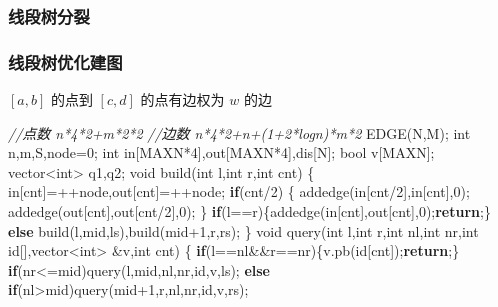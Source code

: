 \documentclass[
]{article}
\newenvironment{Shaded}{}{}
\newcommand{\CommentTok}[1]{\textcolor[rgb]{0.38,0.63,0.69}{\textit{#1}}}
\newcommand{\ControlFlowTok}[1]{\textcolor[rgb]{0.00,0.44,0.13}{\textbf{#1}}}
\newcommand{\DataTypeTok}[1]{\textcolor[rgb]{0.56,0.13,0.00}{#1}}
\newcommand{\DecValTok}[1]{\textcolor[rgb]{0.25,0.63,0.44}{#1}}
\newcommand{\NormalTok}[1]{#1}
\begin{document}
\hypertarget{ux7ebfux6bb5ux6811ux5206ux88c2}{%
\subsubsection{线段树分裂}\label{ux7ebfux6bb5ux6811ux5206ux88c2}}

\hypertarget{ux7ebfux6bb5ux6811ux4f18ux5316ux5efaux56fe}{%
\subsubsection{线段树优化建图}\label{ux7ebfux6bb5ux6811ux4f18ux5316ux5efaux56fe}}

\([a,b]\) 的点到 \([c,d]\) 的点有边权为 \(w\) 的边

\begin{Shaded}
\begin{Highlighting}[]
\CommentTok{//点数 n*4*2+m*2*2}
\CommentTok{//边数 n*4*2+n+(1+2*logn)*m*2}
\NormalTok{EDGE(N,M);}
\DataTypeTok{int}\NormalTok{ n,m,S,node=}\DecValTok{0}\NormalTok{;}
\DataTypeTok{int}\NormalTok{ in[MAXN*}\DecValTok{4}\NormalTok{],out[MAXN*}\DecValTok{4}\NormalTok{],dis[N];}
\DataTypeTok{bool}\NormalTok{ v[MAXN];}
\NormalTok{vector\textless{}}\DataTypeTok{int}\NormalTok{\textgreater{} q1,q2;}
\DataTypeTok{void}\NormalTok{ build(}\DataTypeTok{int}\NormalTok{ l,}\DataTypeTok{int}\NormalTok{ r,}\DataTypeTok{int}\NormalTok{ cnt)}
\NormalTok{\{}
\NormalTok{    in[cnt]=++node,out[cnt]=++node;}
    \ControlFlowTok{if}\NormalTok{(cnt/}\DecValTok{2}\NormalTok{)}
\NormalTok{    \{}
\NormalTok{        addedge(in[cnt/}\DecValTok{2}\NormalTok{],in[cnt],}\DecValTok{0}\NormalTok{);}
\NormalTok{        addedge(out[cnt],out[cnt/}\DecValTok{2}\NormalTok{],}\DecValTok{0}\NormalTok{);}
\NormalTok{    \}}
    \ControlFlowTok{if}\NormalTok{(l==r)\{addedge(in[cnt],out[cnt],}\DecValTok{0}\NormalTok{);}\ControlFlowTok{return}\NormalTok{;\}}
    \ControlFlowTok{else}\NormalTok{ build(l,mid,ls),build(mid+}\DecValTok{1}\NormalTok{,r,rs);}
\NormalTok{\}}
\DataTypeTok{void}\NormalTok{ query(}\DataTypeTok{int}\NormalTok{ l,}\DataTypeTok{int}\NormalTok{ r,}\DataTypeTok{int}\NormalTok{ nl,}\DataTypeTok{int}\NormalTok{ nr,}\DataTypeTok{int}\NormalTok{ id[],vector\textless{}}\DataTypeTok{int}\NormalTok{\textgreater{} \&v,}\DataTypeTok{int}\NormalTok{ cnt)}
\NormalTok{\{}
    \ControlFlowTok{if}\NormalTok{(l==nl\&\&r==nr)\{v.pb(id[cnt]);}\ControlFlowTok{return}\NormalTok{;\}}
    \ControlFlowTok{if}\NormalTok{(nr\textless{}=mid)query(l,mid,nl,nr,id,v,ls);}
    \ControlFlowTok{else} \ControlFlowTok{if}\NormalTok{(nl\textgreater{}mid)query(mid+}\DecValTok{1}\NormalTok{,r,nl,nr,id,v,rs);}

\end{Highlighting}
\end{Shaded}
\end{document}
